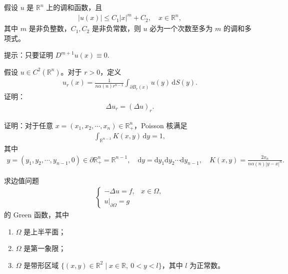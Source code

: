 \documentclass[../../main.tex]{subfiles}%
\begin{document}
\begin{theorem}[推广的Liouville定理]\label{theorem:推广的Liouville定理}
假设 $u$ 是 $\mathbb{R}^n$ 上的调和函数，且
\begin{align*}
|u(x)| \leqslant C_1|x|^m + C_2,\quad x\in\mathbb{R}^n,
\end{align*}
其中 $m$ 是非负整数，$C_1,C_2$ 是非负常数，则 $u$ 必为一个次数至多为 $m$ 的调和多项式。
\end{theorem}
\begin{note}
提示：只要证明 $D^{m+1}u(x)\equiv 0$.
\end{note}

\begin{example}
假设 $u\in C^2(\mathbb{R}^n)$。对于 $r>0$，定义
\begin{align*}
u_r(x) = \frac{1}{n\alpha(n)r^{n-1}} \int_{\partial B_r(x)} u(y)\,\mathrm{d}S(y).
\end{align*}
证明：
\begin{align*}
\Delta u_r = (\Delta u)_r.
\end{align*}
\end{example}

\begin{example}
证明：对于任意 $x=(x_1,x_2,\cdots,x_n)\in\mathbb{R}_+^n$，Poisson 核满足
\begin{align*}
\int_{\mathbb{R}^{n-1}} K(x,y)\,\mathrm{d}y = 1,
\end{align*}
其中
\begin{align*}
y=(y_1,y_2,\cdots,y_{n-1},0)\in\partial\mathbb{R}_+^n=\mathbb{R}^{n-1},\quad \mathrm{d}y=\mathrm{d}y_1\mathrm{d}y_2\cdots\mathrm{d}y_{n-1},\quad K(x,y)=\frac{2x_n}{n\alpha(n)|y-x|^n}.
\end{align*}
\end{example}

\begin{example}
求边值问题
\begin{align*}
\begin{cases}
-\Delta u = f, & x\in\Omega, \\
u|_{\partial\Omega} = g
\end{cases}
\end{align*}
的 Green 函数，其中
\begin{enumerate}[(1)]
\item $\Omega$ 是上半平面；
\item $\Omega$ 是第一象限；
\item $\Omega$ 是带形区域 $\{(x,y)\in\mathbb{R}^2 \mid x\in\mathbb{R},\ 0<y<l\}$，其中 $l$ 为正常数。
\end{enumerate}
\end{example}
\end{document}
